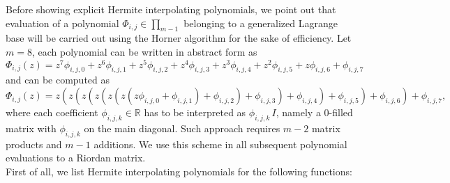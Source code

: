 
Before showing explicit Hermite interpolating polynomials, we point out that
evaluation of a polynomial $\Phi_{i,j}\in\prod_{m-1}$ belonging to a
generalized Lagrange base will be carried out using the Horner algorithm for
the sake of efficiency. Let $m=8$, each polynomial can be written in abstract
form as
\begin{displaymath}
\Phi_{i,j}{\left (z \right )} = z^{7} \phi_{i,j,0} + z^{6} \phi_{i,j,1} + z^{5} \phi_{i,j,2} + z^{4} \phi_{i,j,3} + z^{3} \phi_{i,j,4} + z^{2} \phi_{i,j,5} + z \phi_{i,j,6} + \phi_{i,j,7}
\end{displaymath}
and can be computed as
\begin{displaymath}
\Phi_{i,j}{\left (z \right )} = z \left(z \left(z \left(z \left(z \left(z \left(z \phi_{i,j,0} + \phi_{i,j,1}\right) + \phi_{i,j,2}\right) + \phi_{i,j,3}\right) + \phi_{i,j,4}\right) + \phi_{i,j,5}\right) + \phi_{i,j,6}\right) + \phi_{i,j,7},
\end{displaymath}
where each coefficient $\phi_{i,j,k}\in\mathbb{R}$ has to be interpreted as
$\phi_{i,j,k}\,I$, namely a $0$-filled matrix with $\phi_{i,j,k}$ on the main
diagonal. Such approach requires $m-2$ matrix products and $m-1$ additions.  We
use this scheme in all subsequent polynomial evaluations to a Riordan matrix.
\\
First of all, we list Hermite interpolating polynomials for the following functions:
